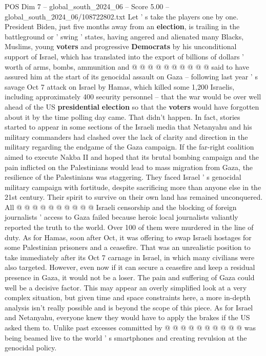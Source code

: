 \begin{textsample}{POS Dim 7 – global\_south\_2024\_06 – Score 5.00 – global\_south\_2024\_06/108722802.txt}
Let ' s take the players one by one.
President Biden, just five months away from an \textbf{election}, is trailing in the battleground or ' swing ' states, having angered and alienated many Blacks, Muslims, young \textbf{voters} and progressive \textbf{Democrats} by his unconditional support of Israel, which has translated into the export of billions of dollars ' worth of arms, bombs, ammunition and @ @ @ @ @ @ @ @ @ @ said to have assured him at the start of its genocidal assault on Gaza -- following last year ' s savage Oct 7 attack on Israel by Hamas, which killed some 1,200 Israelis, including approximately 400 security personnel -- that the war would be over well ahead of the US \textbf{presidential} \textbf{election} so that the \textbf{voters} would have forgotten about it by the time polling day came.
That didn't happen.
In fact, stories started to appear in some sections of the Israeli media that Netanyahu and his military commanders had clashed over the lack of clarity and direction in the military regarding the endgame of the Gaza campaign.
If the far-right coalition aimed to execute Nakba II and hoped that its brutal bombing campaign and the pain inflicted on the Palestinians would lead to mass migration from Gaza, the resilience of the Palestinians was staggering.
They faced Israel ' s genocidal military campaign with fortitude, despite sacrificing more than anyone else in the 21st century.
Their spirit to survive on their own land has remained unconquered.
All @ @ @ @ @ @ @ @ @ @ Israeli censorship and the blocking of foreign journalists ' access to Gaza failed because heroic local journalists valiantly reported the truth to the world.
Over 100 of them were murdered in the line of duty.
As for Hamas, soon after Oct, it was offering to swap Israeli hostages for some Palestinian prisoners and a ceasefire.
That was an unrealistic position to take immediately after its Oct 7 carnage in Israel, in which many civilians were also targeted.
However, even now if it can secure a ceasefire and keep a residual presence in Gaza, it would not be a loser.
The pain and suffering of Gaza could well be a decisive factor.
This may appear an overly simplified look at a very complex situation, but given time and space constraints here, a more in-depth analysis isn't really possible and is beyond the scope of this piece.
As for Israel and Netanyahu, everyone knew they would have to apply the brakes if the US asked them to.
Unlike past excesses committed by @ @ @ @ @ @ @ @ @ @ was being beamed live to the world ' s smartphones and creating revulsion at the genocidal policy.

\end{textsample}
